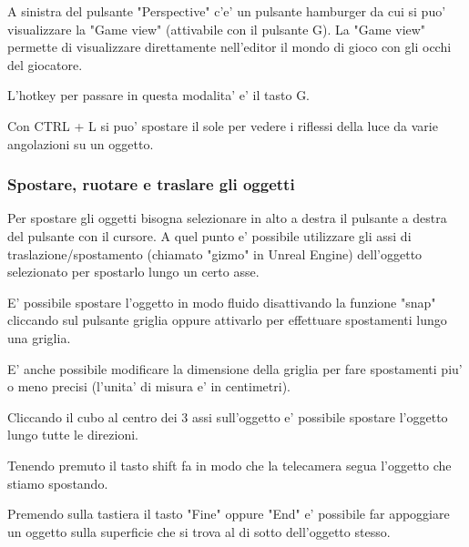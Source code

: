             A sinistra del pulsante "Perspective" c'e' un pulsante hamburger da cui si puo' visualizzare la "Game view" (attivabile con il pulsante G). La "Game view" permette di visualizzare direttamente nell'editor il mondo di gioco con gli occhi del giocatore.

            \begin{notebox}
                L'hotkey per passare in questa modalita' e' il tasto G.
            \end{notebox}

            Con CTRL + L si puo' spostare il sole per vedere i riflessi della luce da varie angolazioni su un oggetto.


            \subsubsection{Spostare, ruotare e traslare gli oggetti}


                Per spostare gli oggetti bisogna selezionare in alto a destra il pulsante \UEMovementEditingIcon a destra del pulsante con il cursore. A quel punto e' possibile utilizzare gli assi di traslazione/spostamento (chiamato "gizmo" in Unreal Engine) dell'oggetto selezionato per spostarlo lungo un certo asse.

                \begin{notebox}
                    E' possibile spostare l'oggetto in modo fluido disattivando la funzione "snap" cliccando sul pulsante griglia \UEGridSnappingIcon oppure attivarlo per effettuare spostamenti lungo una griglia.

                    E' anche possibile modificare la dimensione della griglia per fare spostamenti piu' o meno precisi (l'unita' di misura e' in centimetri).
                \end{notebox}

                Cliccando il cubo al centro dei 3 assi sull'oggetto e' possibile spostare l'oggetto lungo tutte le direzioni.

                \begin{notebox}
                    Tenendo premuto il tasto shift fa in modo che la telecamera segua l'oggetto che stiamo spostando.
                \end{notebox}

                \begin{notebox}
                    Premendo sulla tastiera il tasto "Fine" oppure "End" e' possibile far appoggiare un oggetto sulla superficie che si trova al di sotto dell'oggetto stesso.
                \end{notebox}

